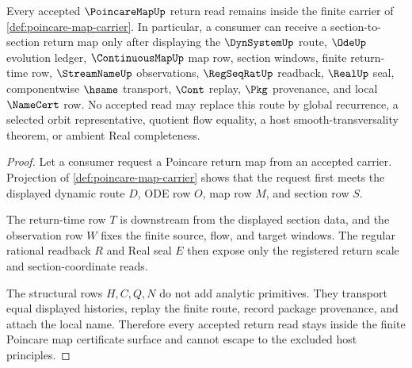 \begin{theorem}
\label{thm:poincare-map-return-nonescape}
Every accepted $\PoincareMapUp$ return read remains inside the finite carrier of \autoref{def:poincare-map-carrier}. In particular, a consumer can receive a section-to-section return map only after displaying the $\DynSystemUp$ route, $\OdeUp$ evolution ledger, $\ContinuousMapUp$ map row, section windows, finite return-time row, $\StreamNameUp$ observations, $\RegSeqRatUp$ readback, $\RealUp$ seal, componentwise $\hsame$ transport, $\Cont$ replay, $\Pkg$ provenance, and local $\NameCert$ row. No accepted read may replace this route by global recurrence, a selected orbit representative, quotient flow equality, a host smooth-transversality theorem, or ambient Real completeness.
\end{theorem}
\begin{proof}
Let a consumer request a Poincare return map from an accepted carrier. Projection of \autoref{def:poincare-map-carrier} shows that the request first meets the displayed dynamic route $D$, ODE row $O$, map row $M$, and section row $S$.

The return-time row $T$ is downstream from the displayed section data, and the observation row $W$ fixes the finite source, flow, and target windows. The regular rational readback $R$ and Real seal $E$ then expose only the registered return scale and section-coordinate reads.

The structural rows $H,C,Q,N$ do not add analytic primitives. They transport equal displayed histories, replay the finite route, record package provenance, and attach the local name. Therefore every accepted return read stays inside the finite Poincare map certificate surface and cannot escape to the excluded host principles.
\end{proof}



